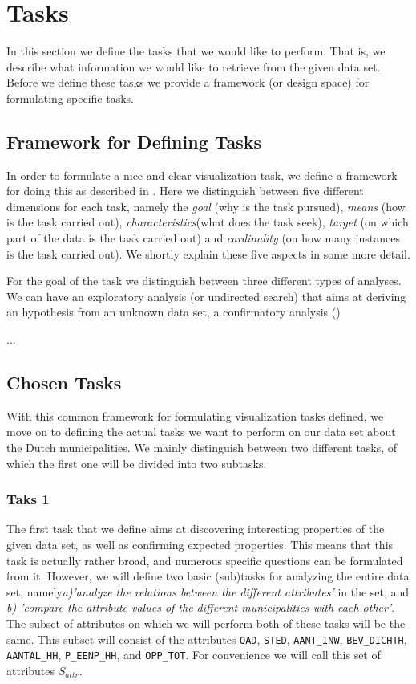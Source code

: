 \section{Tasks}

In this section we define the tasks that we would like to perform. That is, we describe what information we would like to retrieve from the given data set. Before we define these tasks we provide a framework (or design space) for formulating specific tasks.

\subsection{Framework for Defining Tasks}
In order to formulate a nice and clear visualization task, we define a framework for doing this as described in \cite{schulz2013design}. Here we distinguish between five different dimensions for each task, namely the \textit{goal} (why is the task pursued), \textit{means} (how is the task carried out), \textit{characteristics}(what does the task seek), \textit{target} (on which part of the data is the task carried out) and \textit{cardinality} (on how many instances is the task carried out). We shortly explain these five aspects in some more detail.

For the goal of the task we distinguish between three different types of analyses. We can have an exploratory analysis (or undirected search) that aims at deriving an hypothesis from an unknown data set, a confirmatory analysis ()

\todo{!}...

\subsection{Chosen Tasks}
With this common framework for formulating visualization tasks defined, we move on to defining the actual tasks we want to perform on our data set about the Dutch municipalities. We mainly distinguish between two different tasks, of which the first one will be divided into two subtasks.

\subsubsection{Taks 1}
The first task that we define aims at discovering interesting properties of the given data set, as well as confirming expected properties. This means that this task is actually rather broad, and numerous specific questions can be formulated from it. However, we will define two basic (sub)tasks for analyzing the entire data set, namely\textit{a)'analyze the relations between the different attributes'} in the set, and \textit{b) 'compare the attribute values of the different municipalities with each other'}. The subset of attributes on which we will perform both of these tasks will be the same. This subset will consist of the attributes \texttt{OAD}, \texttt{STED}, \texttt{AANT\_INW}, \texttt{BEV\_DICHTH}, \texttt{AANTAL\_HH}, \texttt{P\_EENP\_HH}, and \texttt{OPP\_TOT}. For convenience we will call this set of attributes $S_{attr}$.

